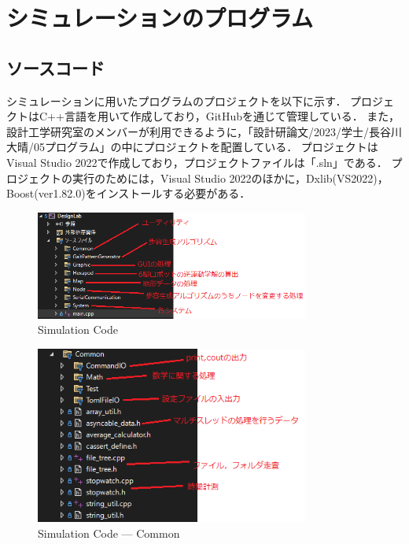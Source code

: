 ﻿
\chapter{シミュレーションのプログラム}\label{chapter:appendix_source}
\section{ソースコード}
シミュレーションに用いたプログラムのプロジェクトを以下に示す．
プロジェクトはC++言語を用いて作成しており，GitHubを通じて管理している．
また，設計工学研究室のメンバーが利用できるように，「設計研論文/2023/学士/長谷川大晴/05プログラム」の中にプロジェクトを配置している．
プロジェクトはVisual Studio 2022で作成しており，プロジェクトファイルは「.sln」である．
プロジェクトの実行のためには，Visual Studio 2022のほかに，Dxlib(VS2022)，Boost(ver1.82.0)をインストールする必要がある．

\begin{figure}[htbp]
  \begin{center}
    \includegraphics[width=90mm, clip]{figure/appendix/C++.png}
    \caption{Simulation Code}
    \label{fig:1} %
  \end{center}
\end{figure}

\begin{figure}[htbp]
  \begin{center}
    \includegraphics[width=90mm, clip]{figure/appendix/C++_Common.png}
    \caption{Simulation Code --- Common}
    \label{fig:2} %
  \end{center}
\end{figure}

